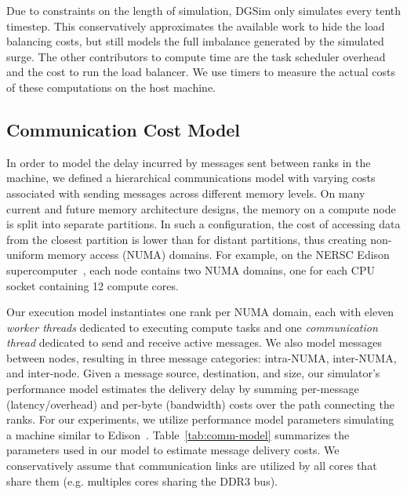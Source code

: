 Due to constraints on the length of simulation, DGSim only simulates every tenth timestep. This conservatively approximates the available work to hide the load balancing costs, but still models the full imbalance generated by the simulated surge.
The other contributors to compute time are the task scheduler overhead and the cost to run the load balancer.
We use timers to measure the actual costs of these computations on the host machine.

\subsection{Communication Cost Model}

In order to model the delay incurred by messages sent between ranks in
the machine, we defined a hierarchical communications model with varying
costs associated with sending messages across different memory levels.
On many current and future memory architecture designs, the memory on
a compute node is split into separate partitions.
In such a configuration, the cost of accessing data from the closest
partition is lower than for distant partitions, thus
creating non-uniform memory access (NUMA) domains.
For example, on the NERSC Edison supercomputer~\cite{Edison},
each node contains two NUMA domains, one for each CPU socket containing
12 compute cores.

Our execution model instantiates one rank per NUMA domain, each with
eleven {\it worker threads} dedicated to executing compute tasks and one
{\it communication thread} dedicated to send and receive active messages.
We also model messages between nodes, resulting in three message categories:
intra-NUMA, inter-NUMA, and inter-node.
Given a message source, destination, and size,
our simulator's performance model estimates the delivery delay by
summing per-message (latency/overhead) and per-byte
(bandwidth) costs over the path connecting the ranks.
For our experiments, we utilize performance model parameters simulating
a machine similar to Edison~\cite{Edison}.
Table~\ref{tab:comm-model} summarizes the parameters used in our
model to estimate message delivery costs.
We conservatively assume that communication links are utilized
by all cores that share them (e.g. multiples cores sharing the DDR3 bus).

